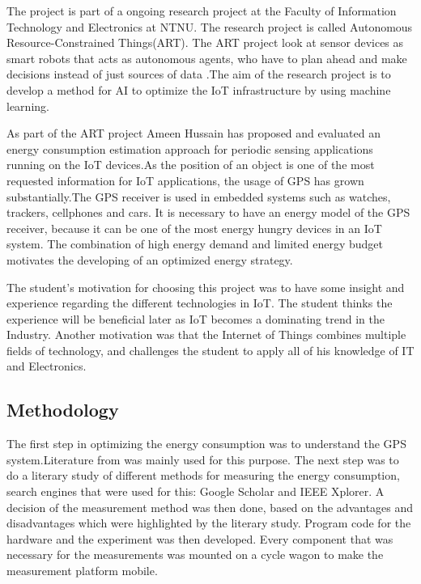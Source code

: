 The project is part of a ongoing research project at the Faculty of Information Technology and Electronics at NTNU. The research project is called Autonomous Resource-Constrained Things(ART).  The ART project look at sensor devices as  smart robots that acts as autonomous agents, who have to plan ahead and make decisions instead of just sources of data \cite{kraemer}.The aim of the research project is to develop a method for AI to optimize the IoT infrastructure by using machine learning.

As part of the ART project Ameen Hussain has proposed and evaluated an energy consumption estimation approach for periodic sensing applications running on the IoT devices\cite{Amen}.As the position of an object is one of the most requested information for IoT applications, the usage of GPS has grown substantially.The GPS receiver is used in embedded systems such as watches, trackers, cellphones and cars. It is necessary to have an energy model of the GPS receiver, because it can be one of the most energy hungry devices in an IoT system. The combination of high energy demand and limited energy budget motivates the developing of an optimized energy strategy. 

The student's motivation for choosing this project was to have some insight and experience regarding the different technologies in IoT. The student thinks the experience will be beneficial later as IoT becomes a dominating trend in the Industry. Another motivation was that the Internet of Things combines multiple fields of technology, and challenges the student to apply all of his knowledge of IT and Electronics.


\subsection{Methodology}


The first step in optimizing the energy consumption was to understand the GPS system.Literature from  \cite{GPS} was mainly used for this purpose. The next step was to do a literary study of different methods for measuring the energy consumption, search engines that were used for this: Google Scholar and IEEE Xplorer. 
A decision of the measurement method was then done, based on the advantages and disadvantages which were highlighted by the literary study. Program code for the hardware and the experiment was then developed. Every component that was necessary for the measurements was mounted on a cycle wagon to make the measurement platform mobile. 

